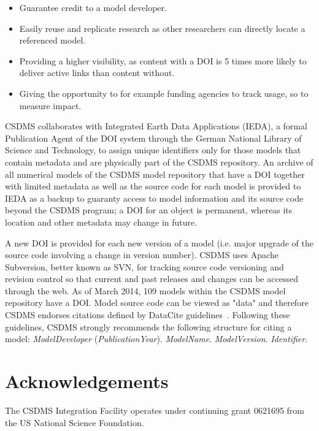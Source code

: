 \documentclass[11pt, oneside]{amsart}
\begin{document}
\begin{itemize}

\item Guarantee credit to a model developer.

\item Easily reuse and replicate research as other researchers can directly
      locate a referenced model.

\item Providing a higher visibility, as content with a DOI is 5 times more
      likely to deliver active links than content without.

\item Giving the opportunity to for example funding agencies to track usage,
      so to measure impact.

\end{itemize}

CSDMS collaborates with Integrated Earth Data Applications
(IEDA), a formal Publication Agent of the DOI system through the German National
Library of Science and Technology, to assign unique identifiers only for those
models that contain metadata and are physically part of the CSDMS repository. An
archive of all numerical models of the CSDMS model repository that have a DOI
together with limited metadata as well as the source code for each model is
provided to IEDA as a backup to guaranty access to model information and its
source code beyond the CSDMS program; a DOI for an object is permanent, whereas
its location and other metadata may change in future.

A new DOI is provided for each new version of a model (i.e. major upgrade of the
source code involving a change in version number). CSDMS uses Apache Subversion,
better known as SVN, for tracking source code versioning and revision control so
that current and past releases and changes can be accessed through the web. As
of March 2014, 109 models within the CSDMS model repository have a DOI. Model
source code can be viewed as "data" and therefore CSDMS endorses citations
defined by DataCite guidelines~\cite{brase2009datacite}. Following these guidelines, CSDMS
strongly recommends the following structure for citing a model:
\emph{ModelDeveloper} (\emph{PublicationYear}). \emph{ModelName}.
\emph{ModelVersion}. \emph{Identifier}.


\section{Acknowledgements}

The CSDMS Integration Facility operates under continuing grant 0621695 from the
US National Science Foundation.



{}
\end{document}
